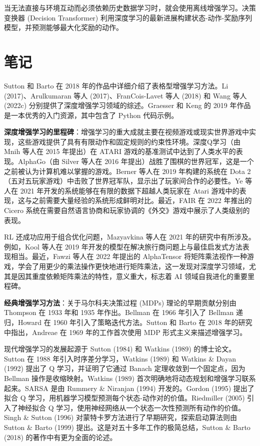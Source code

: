 \documentclass[lang=cn,newtx,10pt,scheme=chinese]{elegantbook}
\begin{document}
当无法直接与环境互动而必须依赖历史数据学习时，就会使用离线增强学习。决策变换器 (Decision Transformer) 利用深度学习的最新进展构建状态-动作-奖励序列模型，并预测能够最大化奖励的动作。


\section{笔记}
Sutton 和 Barto 在 2018 年的作品中详细介绍了表格型增强学习方法。Li (2017)、Arulkumaran 等人 (2017)、FranCois-Lavet 等人 (2018) 和 Wang 等人 (2022c) 分别提供了深度增强学习领域的综述。Graesser 和 Keng 的 2019 年作品是一本优秀的入门资源，其中包含了 Python 代码示例。

\textbf{深度增强学习的里程碑}：增强学习的重大成就主要在视频游戏或现实世界游戏中实现，这些游戏提供了具有有限动作和固定规则的约束性环境。深度Q学习（由 Mnih 等人在 2015 年提出）在 ATARI 游戏的基准测试中达到了人类水平的表现。AlphaGo（由 Silver 等人在 2016 年提出）战胜了围棋的世界冠军，这是一个之前被认为计算机难以掌握的游戏。Berner 等人在 2019 年构建的系统在 Dota 2（五对五玩家游戏）中击败了世界冠军队，显示出了玩家间合作的必要性。Ye 等人在 2021 年开发的系统能够在有限的数据下超越人类玩家在 Atari 游戏中的表现，这与之前需要大量经验的系统形成鲜明对比。最近，FAIR 在 2022 年推出的 Cicero 系统在需要自然语言协商和玩家协调的《外交》游戏中展示了人类级别的表现。

RL 还成功应用于组合优化问题，Mazyavkina 等人在 2021 年的研究中有所涉及。例如，Kool 等人在 2019 年开发的模型在解决旅行商问题上与最佳启发式方法表现相当。最近，Fawzi 等人在 2022 年提出的 AlphaTensor 将矩阵乘法视作一种游戏，学会了用更少的乘法操作更快地进行矩阵乘法，这一发现对深度学习领域，尤其是因其重度依赖矩阵乘法的特性，意义重大，标志着 AI 领域自我进化的重要里程碑。

\textbf{经典增强学习方法}：关于马尔科夫决策过程 (MDPs) 理论的早期贡献分别由 Thompson 在 1933 年和 1935 年作出。Bellman 在 1966 年引入了 Bellman 递归，Howard 在 1960 年引入了策略迭代方法。Sutton 和 Barto 在 2018 年的研究中指出，Andreae 在 1969 年的工作首次使用 MDP 形式主义来描述增强学习。

现代增强学习的发展起源于 Sutton (1984) 和 Watkins (1989) 的博士论文。Sutton 在 1988 年引入时序差分学习，Watkins (1989) 和 Watkins \& Dayan (1992) 提出了 Q 学习，并证明了它通过 Banach 定理收敛到一个固定点，因为 Bellman 操作是收缩映射。Watkins (1989) 首次明确地将动态规划和增强学习联系起来。SARSA 是由 Rummery \& Niranjan (1994) 开发的。Gordon (1995) 提出了拟合 Q 学习，用机器学习模型预测每个状态-动作对的价值。Riedmiller (2005) 引入了神经拟合 Q 学习，使用神经网络从一个状态一次性预测所有动作的价值。Singh \& Sutton (1996) 对蒙特卡罗方法进行了早期研究，探索启动算法则由 Sutton \& Barto (1999) 提出。这是对五十多年工作的极简总结，Sutton \& Barto (2018) 的著作中有更为全面的论述。
\end{document}
